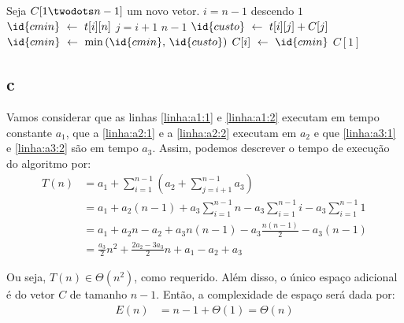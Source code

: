 \begin{codebox}
    \li Seja $C[1 \twodots n - 1]$ um novo vetor. \label{linha:a1:1}
    \li
    \li {} $i = n - 1$ descendo  $1$ \label{linha:for:1}
        \Do
    \li     $\id{cmin} \gets t[i][n]$ \label{linha:a2:1}
    \li     {} $j = i + 1$  $n - 1$ \label{linha:for:2}
            \Do
    \li         $\id{custo} \gets t[i][j] + C[j]$ \label{linha:a3:1}
    \li         $\id{cmin} \gets \min\left(\id{cmin},\, \id{custo}\right)$ \label{linha:a3:2}
            \End
    \li     $C[i] \gets \id{cmin}$ \label{linha:a2:2}
        \End
    \li
    \li {} $C[1]$ \label{linha:a1:2}
\end{codebox}

\itemdsep
\subsection{c}

Vamos considerar que as linhas \ref{linha:a1:1} e \ref{linha:a1:2} executam em tempo constante $a_1$, que a \ref{linha:a2:1} e a \ref{linha:a2:2} executam em $a_2$ e que \ref{linha:a3:1} e \ref{linha:a3:2} são em tempo $a_3$. Assim, podemos descrever o tempo de execução do algoritmo por:
\begin{align*}
    T(n) &= a_1 + \sum_{i = 1}^{n - 1}\left(a_2 + \sum_{j = i + 1}^{n - 1} a_3\right) \\
    &= a_1 + a_2 (n - 1) + a_3 \sum_{i = 1}^{n - 1} n - a_3 \sum_{i = 1}^{n - 1} i - a_3 \sum_{i = 1}^{n - 1} 1 \\
    &= a_1 + a_2 n - a_2 + a_3 n (n - 1) - a_3 \frac{n (n - 1)}{2} - a_3 (n - 1) \\
    &= \frac{a_3}{2} n^2 + \frac{2 a_2 - 3 a_3}{2} n + a_1 - a_2 + a_3
\end{align*}

Ou seja, $T(n) \in \Theta\left(n^2\right)$, como requerido. Além disso, o único espaço adicional é do vetor $C$ de tamanho $n - 1$. Então, a complexidade de espaço será dada por:
\begin{align*}
    E(n) &= n - 1 + \Theta(1) = \Theta(n)
\end{align*}
